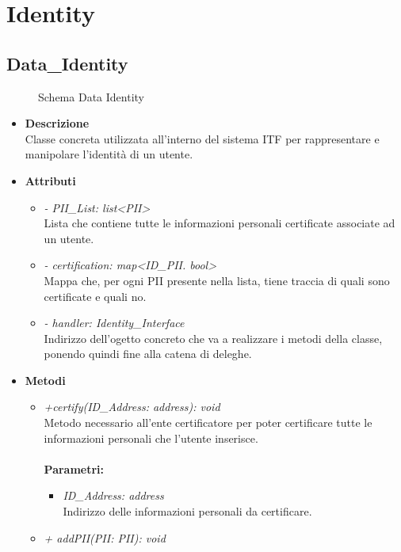 \section{Identity}
\subsection{Data\_Identity}
\begin{figure}[!h]
	\centering
	\caption{Schema Data Identity}
\end{figure}
\begin{itemize}
	\item \textbf{Descrizione}\\
	Classe concreta utilizzata all'interno del sistema \gls{ITF} per rappresentare e manipolare l'identità di un utente.
	\item \textbf{Attributi}
	\begin{itemize}
		\item \textit{- PII\_List: list<PII>}\\
		Lista che contiene tutte le informazioni personali certificate associate ad un utente.
		\item \textit{- certification: map<ID\_PII. bool>}\\
		Mappa che, per ogni \gls{PII} presente nella lista, tiene traccia di quali sono certificate e quali no.
		\item \textit{- handler: Identity\_Interface}\\
		Indirizzo dell'ogetto concreto che va a realizzare i metodi della classe, ponendo quindi fine alla catena di deleghe.
	\end{itemize}
	\item \textbf{Metodi}
	\begin{itemize}
		\item \textit{+certify(ID\_Address: address): void}\\
		Metodo necessario all'ente certificatore per poter certificare tutte le informazioni personali che l'utente inserisce.\\\\
		\textbf{Parametri:}
		\begin{itemize}
			\item \textit{ID\_Address: address}\\
			Indirizzo delle informazioni personali da certificare.
		\end{itemize}
		\item \textit{+ addPII(PII: PII): void}\\

\end{itemize}
\end{itemize}
